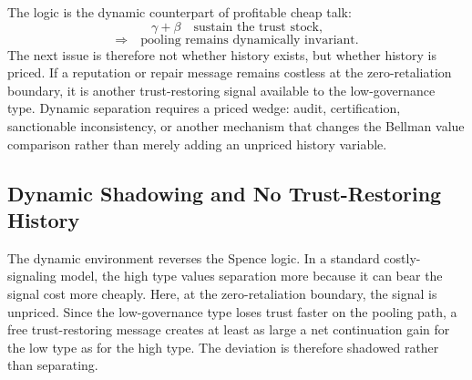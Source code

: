 \documentclass[review,authoryear]{elsarticle}
\theoremstyle{definition}
\theoremstyle{plain}
\begin{document}
The logic is the dynamic counterpart of profitable cheap talk:
\[
\gamma+\beta
\quad\text{sustain the trust stock,}
\]
\[
\Rightarrow\quad
\text{pooling remains dynamically invariant.}
\]
The next issue is therefore not whether history exists, but whether history is
priced.  If a reputation or repair message remains costless at the
zero-retaliation boundary, it is another trust-restoring signal available to
the low-governance type.  Dynamic separation requires a priced wedge: audit,
certification, sanctionable inconsistency, or another mechanism that changes
the Bellman value comparison rather than merely adding an unpriced history
variable.

\subsection{Dynamic Shadowing and No Trust-Restoring History}
\label{subsec:dynamic-shadowing}

The dynamic environment reverses the Spence logic.  In a standard
costly-signaling model, the high type values separation more because it can
bear the signal cost more cheaply.  Here, at the zero-retaliation boundary, the
signal is unpriced.  Since the low-governance type loses trust faster on the
pooling path, a free trust-restoring message creates at least as large a net
continuation gain for the low type as for the high type.  The deviation is
therefore shadowed rather than separating.
\end{document}
